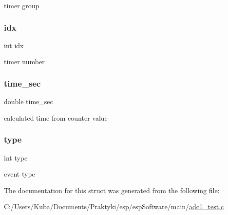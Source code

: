 timer group \mbox{\label{structtimer__event__t_ae40354a1051342eb5a9db005715dcfa9}} 
\subsubsection{\texorpdfstring{idx}{idx}}
{\footnotesize\ttfamily int idx}

timer number \mbox{\label{structtimer__event__t_ad7f20d4511a6cb098642a8c1868f8368}} 
\subsubsection{\texorpdfstring{time\+\_\+sec}{time\_sec}}
{\footnotesize\ttfamily double time\+\_\+sec}

calculated time from counter value \mbox{\label{structtimer__event__t_ac765329451135abec74c45e1897abf26}} 
\subsubsection{\texorpdfstring{type}{type}}
{\footnotesize\ttfamily int type}

event type 

The documentation for this struct was generated from the following file\+:\begin{DoxyCompactItemize}
\item 
C\+:/\+Users/\+Kuba/\+Documents/\+Praktyki/esp/esp\+Software/main/\hyperlink{adc1__test_8c}{adc1\+\_\+test.\+c}\end{DoxyCompactItemize}
